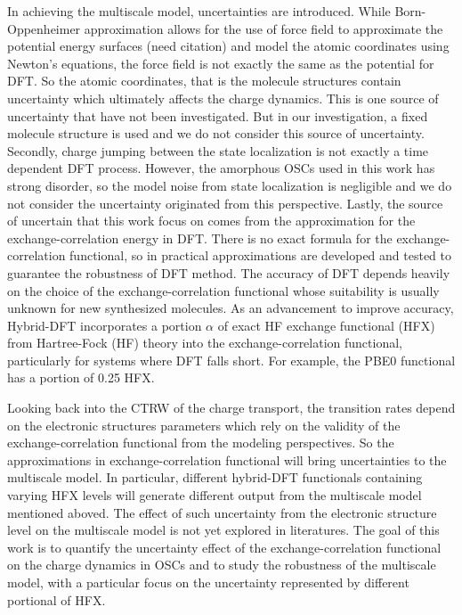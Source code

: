 \documentclass[letterpaper,12pt]{article}
\begin{document}
In achieving the multiscale model, uncertainties are introduced. 
While Born-Oppenheimer approximation allows for the use of force field to approximate the potential energy surfaces (need citation) and model the atomic coordinates using Newton’s equations, the force field is not exactly the same as the potential for DFT. 
So the atomic coordinates, that is the molecule structures contain uncertainty which ultimately affects the charge dynamics. 
This is one source of uncertainty that have not been investigated. But in our investigation, a fixed molecule structure is used and we do not consider this source of uncertainty. 
Secondly, charge jumping between the state localization is not exactly a time dependent DFT process. 
However, the amorphous OSCs used in this work has strong disorder, so the model noise from state localization is negligible and we do not consider the uncertainty originated from this perspective.
Lastly, the source of uncertain that this work focus on comes from the approximation for the exchange-correlation energy in DFT. 
There is no exact formula for the exchange-correlation functional, so in practical approximations are developed and tested to guarantee the robustness of DFT method. 
The accuracy of DFT depends heavily on the choice of the exchange-correlation functional whose suitability is usually unknown for new synthesized molecules. 
As an advancement to improve accuracy, Hybrid-DFT incorporates a portion $\alpha$ of exact HF exchange functional (HFX) from Hartree-Fock (HF) theory into the exchange-correlation functional, particularly for systems where DFT falls short. For example, the PBE0 functional has a portion of 0.25 HFX.

Looking back into the CTRW of the charge transport, the transition rates depend on the electronic structures parameters which rely on the validity of the exchange-correlation functional from the modeling perspectives.
So the approximations in exchange-correlation functional will bring uncertainties to the multiscale model. 
In particular, different hybrid-DFT functionals containing varying HFX levels will generate different output from the multiscale model mentioned aboved. 
The effect of such uncertainty from the electronic structure level on the multiscale model is not yet explored in literatures. 
The goal of this work is to quantify the uncertainty effect of the exchange-correlation functional on the charge dynamics in OSCs and to study the robustness of the multiscale model, with a particular focus on the uncertainty represented by different portional of HFX.
\end{document}
